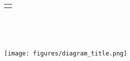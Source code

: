 \begin{titlepage}
	\begin{addmargin}[-1cm]{-3cm}
    \spacedallcaps{\mySubtitle} \\ \medskip
    \begin{tabular}{m{10cm}}
        \\\hline \\
    \end{tabular}

    \begin{center}
        \large  
        \hfill

        \begingroup
            \color{Maroon}\spacedallcaps{\myTitle} \\ \bigskip
        \endgroup

        \large
        \hfill \\
        \spacedallcaps{\myName}

        \vfill

        \texttt{[image: figures/diagram\_title.png]} \\ \medskip
    
        \vfill
        \myFaculty \\
        \myUni \\ \bigskip

        \myTime\ %

        \vfill                      

    \end{center}  
  \end{addmargin}       
\end{titlepage}   
\thispagestyle{empty}
